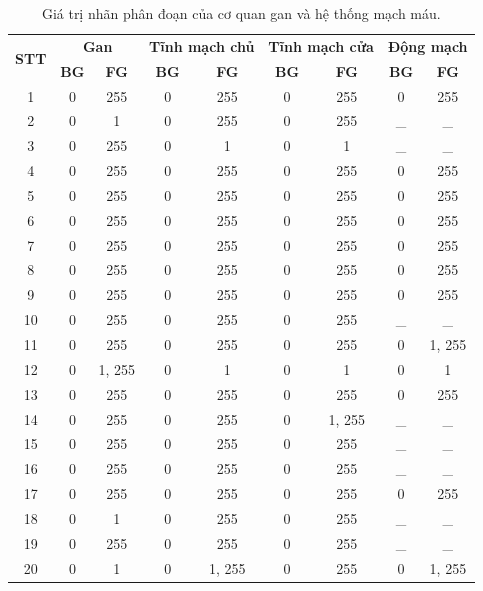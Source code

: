 \begin{table}[h!]
	\newcommand\nextpatient{\\[2mm]}
	\centering
	\caption{Giá trị nhãn phân đoạn của cơ quan gan và hệ thống mạch máu.}
	\label{tab:3d_ircadb_01_value}
	\begin{tabular}{ccccccccc}
		\toprule
		\multirow{2}{*}{\textbf{STT}} & \multicolumn{2}{c}{\textbf{Gan}} & \multicolumn{2}{c}{\textbf{Tĩnh mạch chủ}} & \multicolumn{2}{c}{\textbf{Tĩnh mạch cửa}} & \multicolumn{2}{c}{\textbf{Động mạch}} \\ \cmidrule{2-9} 
		& \textbf{BG\nomenclature{BG}{Background}} & \textbf{FG\nomenclature{FG}{Foreground}} & \textbf{BG} & \textbf{FG} & \textbf{BG} & \textbf{FG} & \textbf{BG} & \textbf{FG} \\ \midrule
		1 & 0 & 255 & 0 & 255 & 0 & 255 & 0 & 255 \nextpatient
		2 & 0 & 1 & 0 & 255 & 0 & 255 & \_ & \_ \nextpatient
		3 & 0 & 255 & 0 & 1 & 0 & 1 & \_ & \_ \nextpatient
		4 & 0 & 255 & 0 & 255 & 0 & 255 & 0 & 255 \nextpatient
		5 & 0 & 255 & 0 & 255 & 0 & 255 & 0 & 255 \nextpatient
		6 & 0 & 255 & 0 & 255 & 0 & 255 & 0 & 255 \nextpatient
		7 & 0 & 255 & 0 & 255 & 0 & 255 & 0 & 255 \nextpatient
		8 & 0 & 255 & 0 & 255 & 0 & 255 & 0 & 255 \nextpatient
		9 & 0 & 255 & 0 & 255 & 0 & 255 & 0 & 255 \nextpatient
		10 & 0 & 255 & 0 & 255 & 0 & 255 &\_  &\_  \nextpatient
		11 & 0 & 255 & 0 & 255 & 0 & 255 & 0 & 1, 255 \nextpatient
		12 & 0 & 1, 255 & 0 & 1 & 0 & 1 & 0 & 1 \nextpatient
		13 & 0 & 255 & 0 & 255 & 0 & 255 & 0 & 255 \nextpatient
		14 & 0 & 255 & 0 & 255 & 0 & 1, 255 &\_  &\_  \nextpatient
		15 & 0 & 255 & 0 & 255 & 0 & 255 & \_ & \_ \nextpatient
		16 & 0 & 255 & 0 & 255 & 0 & 255 & \_ & \_ \nextpatient
		17 & 0 & 255 & 0 & 255 & 0 & 255 & 0 & 255 \nextpatient
		18 & 0 & 1 & 0 & 255 & 0 & 255 & \_ &\_  \nextpatient
		19 & 0 & 255 & 0 & 255 & 0 & 255 & \_ &\_  \nextpatient
		20 & 0 & 1 & 0 & 1, 255 & 0 & 255 & 0 & 1, 255 \\ \bottomrule
	\end{tabular}
\end{table}
